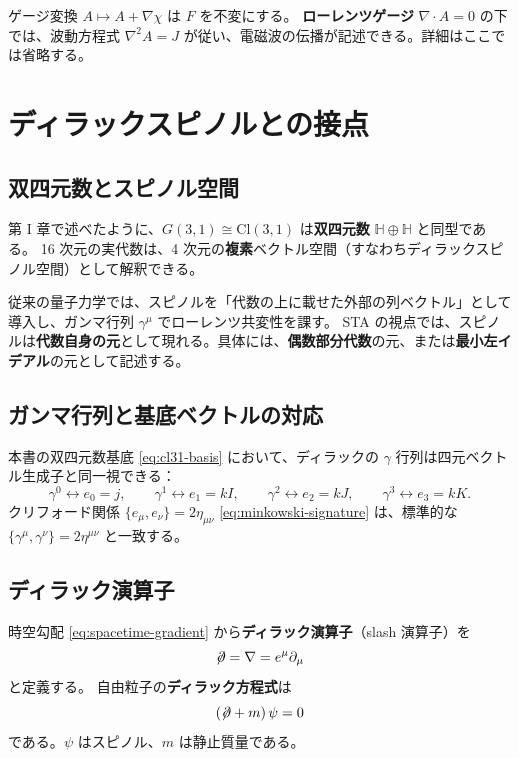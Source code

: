 \documentclass[dvipdfmx,a4paper,oneside]{jsbook}
\numberwithin{equation}{chapter}
\begin{document}
ゲージ変換 \(A \mapsto A + \nabla\chi\) は \(F\) を不変にする。
\textbf{ローレンツゲージ} \(\nabla\cdot A = 0\) の下では、波動方程式 \(\nabla^2 A = J\) が従い、電磁波の伝播が記述できる。詳細はここでは省略する。

\section{ディラックスピノルとの接点}

\subsection{双四元数とスピノル空間}

第 I 章で述べたように、\(G(3,1) \cong \mathrm{Cl}(3,1)\) は\textbf{双四元数} \(\mathbb{H}\oplus\mathbb{H}\) と同型である。
16 次元の実代数は、4 次元の\textbf{複素}ベクトル空間（すなわちディラックスピノル空間）として解釈できる。

従来の量子力学では、スピノルを「代数の上に載せた外部の列ベクトル」として導入し、ガンマ行列 \(\gamma^\mu\) でローレンツ共変性を課す。
STA の視点では、スピノルは\textbf{代数自身の元}として現れる。具体には、\textbf{偶数部分代数}の元、または\textbf{最小左イデアル}の元として記述する。

\subsection{ガンマ行列と基底ベクトルの対応}

本書の双四元数基底 \eqref{eq:cl31-basis} において、ディラックの \(\gamma\) 行列は四元ベクトル生成子と同一視できる：
\begin{equation}
  \gamma^0 \longleftrightarrow e_0 = j, \qquad
  \gamma^1 \longleftrightarrow e_1 = kI, \qquad
  \gamma^2 \longleftrightarrow e_2 = kJ, \qquad
  \gamma^3 \longleftrightarrow e_3 = kK.
  \label{eq:gamma-correspondence}
\end{equation}
クリフォード関係 \(\{e_\mu, e_\nu\} = 2\eta_{\mu\nu}\) \eqref{eq:minkowski-signature} は、標準的な \(\{\gamma^\mu, \gamma^\nu\} = 2\eta^{\mu\nu}\) と一致する。

\subsection{ディラック演算子}

時空勾配 \eqref{eq:spacetime-gradient} から\textbf{ディラック演算子}（slash 演算子）を
\begin{equation}
  \not\!\partial = \nabla = e^\mu \partial_\mu
  \label{eq:dirac-operator}
\end{equation}
と定義する。
自由粒子の\textbf{ディラック方程式}は
\begin{equation}
  (\not\!\partial + m)\,\psi = 0
  \label{eq:dirac-equation}
\end{equation}
である。\(\psi\) はスピノル、\(m\) は静止質量である。
\end{document}
